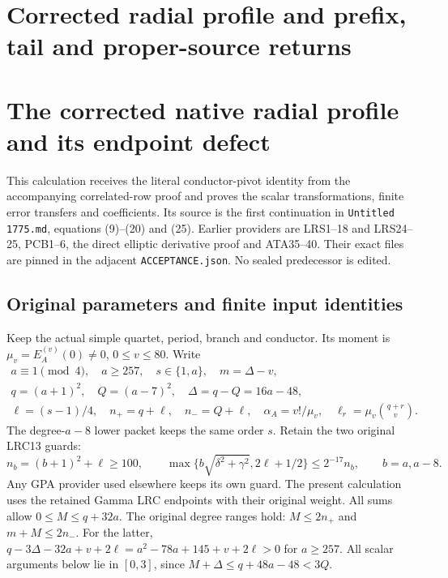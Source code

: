 \documentclass[11pt,a4paper]{article}
\begin{document}
\endgroup

\clearpage
\begingroup


\setcounter{equation}{0}
\renewcommand{\theequation}{A02CRS.\arabic{equation}}
\section*{Corrected radial profile and prefix, tail and proper-source returns}
\begingroup
\section{The corrected native radial profile and its endpoint defect}
\label{a02crs:sec:CRS}

This calculation receives the literal conductor-pivot identity from the
accompanying correlated-row proof and proves the scalar transformations,
finite error transfers and coefficients. Its source is the first
continuation in \texttt{Untitled 1775.md}, equations (9)--(20) and (25).
Earlier providers are LRS1--18 and LRS24--25, PCB1--6, the direct elliptic
derivative proof and ATA35--40. Their exact files are pinned in the
adjacent \texttt{ACCEPTANCE.json}. No sealed predecessor is edited.

\subsection{Original parameters and finite input identities}

Keep the actual simple quartet, period, branch and conductor. Its moment
is $\mu_v=E_A^{(v)}(0)\ne0$, $0\le v\le80$. Write
\[
\begin{gathered}
 a\equiv1\pmod4,\quad a\ge257,\quad s\in\{1,a\},\quad m=\Delta-v,\\
 q=(a+1)^2,\quad Q=(a-7)^2,\quad \Delta=q-Q=16a-48,\\
 \ell=(s-1)/4,\quad n_+=q+\ell,\quad n_-=Q+\ell,\quad
 \alpha_A=v!/\mu_v,\quad \ell_r=\mu_v\binom{q+r}{v}.
\end{gathered}\tag{CRS1}
\]
The degree-$a-8$ lower packet keeps the same order $s$. Retain the two
original LRC13 guards:
\[
 n_b=(b+1)^2+\ell\ge100,\qquad
 \max\{b\sqrt{\delta^2+\gamma^2},2\ell+1/2\}
 \le2^{-17}n_b,\qquad b=a,a-8.                         \tag{CRS2}
\]
Any GPA provider used elsewhere keeps its own guard. The present
calculation uses the retained Gamma LRC endpoints with their original
weight. All sums allow $0\le M\le q+32a$.
The original degree ranges hold: $M\le2n_+$ and $m+M\le2n_-$.
For the latter,
$q-3\Delta-32a+v+2\ell=a^2-78a+145+v+2\ell>0$ for $a\ge257$.
All scalar arguments below lie in $[0,3]$, since
$M+\Delta\le q+48a-48<3Q$.
\end{document}
